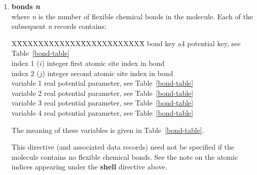 \begin{enumerate}
\item{\bf bonds {\em n}} \\
where {\em n} is the number of flexible chemical bonds in the
molecule.  Each of the subsequent {\em n} records contains:
\begin{tabbing}
X\=XXXXXXXXXXXX\=XXXXXXXXXXXX\=\kill
\> bond key      \> a4      \> potential key, see Table~\ref{bond-table} \\
\> index 1 ($i$) \> integer \> first atomic site index in bond \\
\> index 2 ($j$) \> integer \> second atomic site index in bond \\
\> variable 1    \> real    \> potential parameter, see Table~\ref{bond-table} \\
\> variable 2    \> real    \> potential parameter, see Table~\ref{bond-table} \\
\> variable 3    \> real    \> potential parameter, see Table~\ref{bond-table} \\
\> variable 4    \> real    \> potential parameter, see Table~\ref{bond-table}
\end{tabbing}
The meaning of these variables is given in Table~\ref{bond-table}.

This directive (and associated data records) need not be specified
if the molecule contains no flexible chemical bonds.  See the note
on the atomic indices appearing under the {\bf shell} directive
above.


\end{enumerate}
